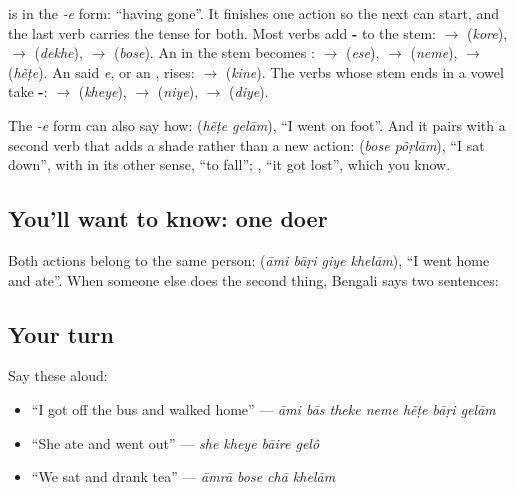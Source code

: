 \textbf{} is \textbf{} in the \emph{-e} form: \textquotedblleft{}having gone\textquotedblright{}. It finishes one action so the next can start, and the last verb carries the tense for both. Most verbs add \textbf{-} to the stem: \textbf{} $\to$ \textbf{} (\emph{kore}), \textbf{} $\to$ \textbf{} (\emph{dekhe}), \textbf{} $\to$ \textbf{} (\emph{bose}). An \textbf{} in the stem becomes \textbf{}: \textbf{} $\to$ \textbf{} (\emph{ese}), \textbf{} $\to$ \textbf{} (\emph{neme}), \textbf{} $\to$ \textbf{} (\emph{hẽṭe}). An \textbf{} said \emph{e}, or an \textbf{}, rises: \textbf{} $\to$ \textbf{} (\emph{kine}). The verbs whose stem ends in a vowel take \textbf{-}: \textbf{} $\to$ \textbf{} (\emph{kheye}), \textbf{} $\to$ \textbf{} (\emph{niye}), \textbf{} $\to$ \textbf{} (\emph{diye}).

The \emph{-e} form can also say how: \textbf{ } (\emph{hẽṭe gelām}), \textquotedblleft{}I went on foot\textquotedblright{}. And it pairs with a second verb that adds a shade rather than a new action: \textbf{ } (\emph{bose pôṛlām}), \textquotedblleft{}I sat down\textquotedblright{}, with \textbf{} in its other sense, \textquotedblleft{}to fall\textquotedblright{}; \textbf{ }, \textquotedblleft{}it got lost\textquotedblright{}, which you know.

\subsection*{You'll want to know: one doer}
Both actions belong to the same person: \textbf{   } (\emph{āmi bāṛi giye khelām}), \textquotedblleft{}I went home and ate\textquotedblright{}. When someone else does the second thing, Bengali says two sentences: \textbf{    }

\subsection*{Your turn}
Say these aloud:

\begin{itemize}
\raggedright
  \item \textquotedblleft{}I got off the bus and walked home\textquotedblright{} — \emph{āmi bās theke neme hẽṭe bāṛi gelām}
  \item \textquotedblleft{}She ate and went out\textquotedblright{} — \emph{she kheye bāire gelô}
  \item \textquotedblleft{}We sat and drank tea\textquotedblright{} — \emph{āmrā bose chā khelām}
\end{itemize}

